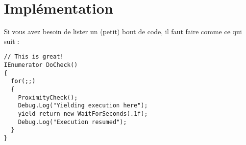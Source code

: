 \chapter{Implémentation}
Si vous avez besoin de lister un (petit) bout de code, il faut faire comme ce qui suit :
\begin{lstlisting}
// This is great!
IEnumerator DoCheck() 
{
  for(;;)
  {
    ProximityCheck();
    Debug.Log("Yielding execution here");
    yield return new WaitForSeconds(.1f);
    Debug.Log("Execution resumed");
  }
}
\end{lstlisting}